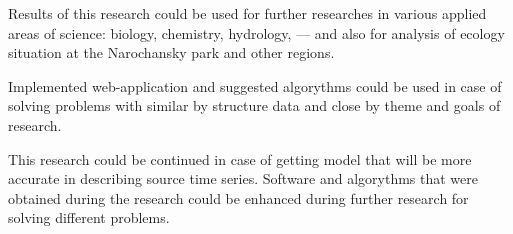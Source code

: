 \documentclass[a4paper,12pt]{report}
\begin{document}
	Results of this research could be used for further researches in various applied areas of science: biology, chemistry, hydrology, --- and also for analysis of ecology situation at the Narochansky park and other regions.

	Implemented web-application and suggested algorythms could be used in case of solving problems with similar by structure data and close by theme and goals of research.

	This research could be continued in case of getting model that will be more accurate in describing source time series. Software and algorythms that were obtained during the research could be enhanced during further research for solving different problems.
\end{document}
